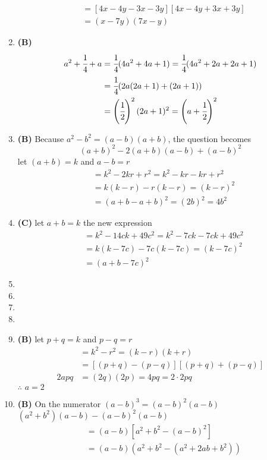 \begin{multicols}{2}
\begin{enumerate}[label={\textbf{\arabic*.}}]
\begin{align*}
    & = \left[4x - 4y -3x - 3y\right]\left[4x - 4y + 3x +  3y\right] \\
    & = (x - 7y)(7x -y)
\end{align*}
\item \textbf{(B)} \begin{align*} 
    a^2 + \cfrac{1}{4} + a &=\cfrac{1}{4}(4a^2 + 4a + 1) = \cfrac{1}{4}(4a^2 + 2a + 2a + 1) \\
    & = \cfrac{1}{4} (2a(2a + 1) + (2a+1)) \\
    &= \left( \cfrac{1}{2} \right)^2 (2a+1)^2 = \left(a + \cfrac{1}{2}\right)^2
\end{align*}
\item \textbf{(B)} Because $a^2 - b^2 = (a-b)(a+b)$, the question becomes
$$(a+b)^2 -2(a+b)(a-b) + (a-b)^2$$ 
let $(a+b) = k$ and $a-b = r$ 
\begin{align*} 
     &= k^2 - 2kr + r^2 = k^2 -kr - kr + r^2 \\
     &= k(k-r)-r(k-r) = (k-r)^2 \\
     & = (a+b-a + b)^2 = (2b)^2 = 4b^2
\end{align*}
\item \textbf{(C)} let $a+b=k$ the new expression
\begin{align*}
    &=  k^2 - 14ck + 49c^2 = k^2 - 7ck -7ck + 49c^2 \\
    & = k(k-7c) -7c(k -7c) = (k-7c)^2 \\
    & = (a + b -7c)^2
\end{align*}
\item 
\item 
\item 
\item 
\item \textbf{(B)} let $p+q = k$ and $p-q = r$ 
\begin{align*} 
    &= k^2 - r^2 = (k-r)(k+r) \\
    &= [(p+q) -(p-q)][(p+q)+(p-q)] \\
   2apq & = (2q)(2p) = 4pq = 2\cdot 2 pq
\end{align*}
$\therefore \,\, a = 2$
\item \textbf{(B)} On the numerator $(a-b)^3=(a-b)^2(a-b)$ \vspace{5pt}\\
$(a^2 + b^2)(a-b) - (a-b)^2(a-b)$ \vspace{-8pt}
    \begin{align*}
        & = (a-b)[a^2 +b^2 -(a-b)^2] \\
        & = (a-b)(a^2 + b^2 - (a^2 + 2ab + b^2)) \\

\end{align*}
\end{enumerate}
\end{multicols}
